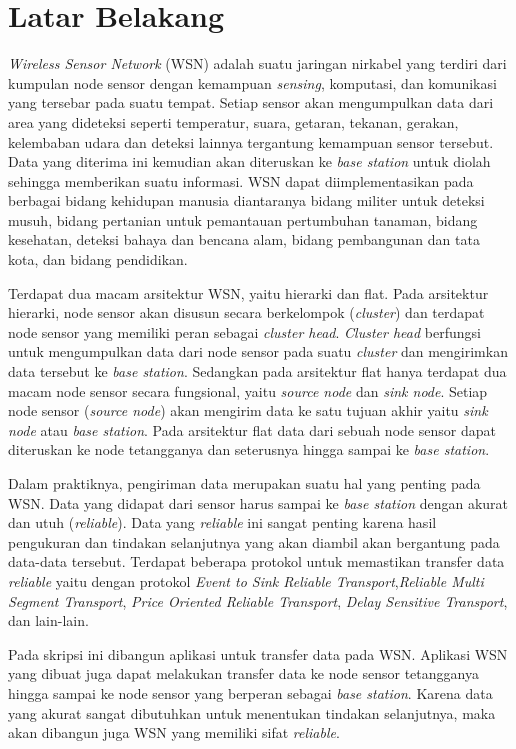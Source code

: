 \documentclass[a4paper,twoside]{article}
\begin{document}
\section{Latar Belakang}
\textit{Wireless Sensor Network} (WSN) adalah suatu jaringan nirkabel yang terdiri dari kumpulan node sensor dengan kemampuan \textit{sensing}, komputasi, dan komunikasi yang tersebar pada suatu tempat. Setiap sensor akan mengumpulkan data dari area yang dideteksi seperti temperatur, suara, getaran, tekanan, gerakan, kelembaban udara dan deteksi lainnya tergantung kemampuan sensor tersebut. Data yang diterima ini kemudian akan diteruskan ke \textit{base station} untuk diolah sehingga memberikan suatu informasi. WSN dapat diimplementasikan pada berbagai bidang kehidupan manusia diantaranya bidang militer untuk deteksi musuh, bidang pertanian untuk pemantauan pertumbuhan tanaman, bidang kesehatan, deteksi bahaya dan bencana alam, bidang pembangunan dan tata kota, dan bidang pendidikan.

Terdapat dua macam arsitektur WSN, yaitu hierarki dan flat. Pada arsitektur hierarki, node sensor akan disusun secara berkelompok (\textit{cluster}) dan terdapat node sensor yang memiliki peran sebagai \textit{cluster head}. \textit{Cluster head} berfungsi untuk mengumpulkan data dari node sensor pada suatu \textit{cluster} dan mengirimkan data tersebut ke \textit{base station}. Sedangkan pada arsitektur flat hanya terdapat dua macam node sensor secara fungsional, yaitu \textit{source node} dan \textit{sink node}. Setiap node sensor (\textit{source node}) akan mengirim data ke satu tujuan akhir yaitu \textit{sink node} atau \textit{base station}. Pada arsitektur flat data dari sebuah node sensor dapat diteruskan ke node tetangganya dan seterusnya hingga sampai ke \textit{base station}.

Dalam praktiknya, pengiriman data merupakan suatu hal yang penting pada WSN. Data yang didapat dari sensor harus sampai ke \textit{base station} dengan akurat dan utuh (\textit{reliable}). Data yang \textit{reliable} ini sangat penting karena hasil pengukuran dan tindakan selanjutnya yang akan diambil akan bergantung pada data-data tersebut. Terdapat beberapa protokol untuk memastikan transfer data \textit{reliable} yaitu dengan protokol \textit{Event to Sink Reliable Transport},\textit{Reliable Multi Segment Transport}, \textit{Price Oriented Reliable Transport}, \textit{Delay Sensitive Transport}, dan lain-lain.

Pada skripsi ini dibangun aplikasi untuk transfer data pada WSN. Aplikasi WSN yang dibuat juga dapat melakukan transfer data ke node sensor tetangganya hingga sampai ke node sensor yang berperan sebagai \textit{base station}. Karena data yang akurat sangat dibutuhkan untuk menentukan tindakan selanjutnya, maka akan dibangun juga WSN yang memiliki sifat \textit{reliable}.
\end{document}
